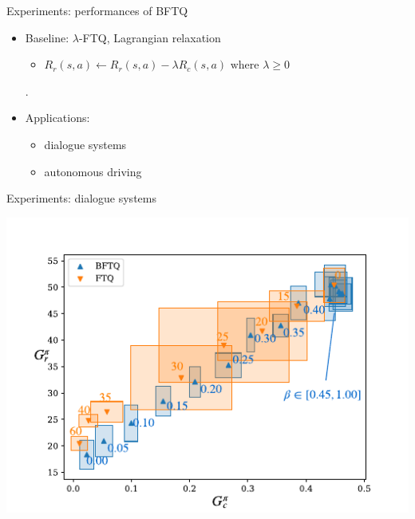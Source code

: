 \documentclass{beamer}
\begin{document}

    \begin{frame}{Experiments: performances of BFTQ}
        \begin{itemize}
            \item Baseline: $\lambda$-FTQ, Lagrangian relaxation
            \begin{itemize}
                \item $R_r(s,a) \leftarrow R_r(s,a) - \lambda R_c(s,a) \text{ where } \lambda \geq 0$
            \end{itemize}.
            \item Applications:
            \begin{itemize}
                \item dialogue systems
                \item autonomous driving
            \end{itemize}
        \end{itemize}
    \end{frame}

    \begin{frame}{Experiments: dialogue systems}
        \begin{center}
            \includegraphics[width=\textwidth]{img/slot-filling.pdf}
        \end{center}
    \end{frame}
\end{document}
